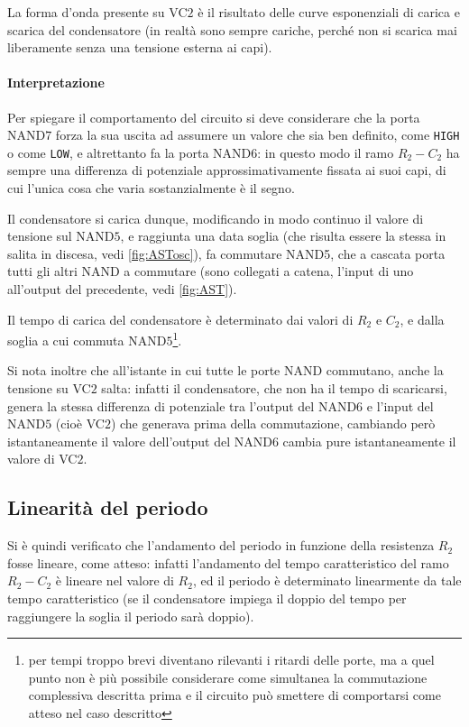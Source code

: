 \documentclass[a4paper,10pt]{article}
\def\code#1{\texttt{#1}}
\begin{document}
La forma d'onda presente su VC$2$ è il risultato delle curve esponenziali di carica e scarica del condensatore (in realtà sono sempre cariche, perché non si scarica mai liberamente senza una tensione esterna ai capi).

\paragraph{Interpretazione} Per spiegare il comportamento del circuito si deve considerare che la porta NAND$7$ forza la sua uscita ad assumere un valore che sia ben definito, come \code{HIGH} o come \code{LOW}, e altrettanto fa la porta NAND$6$: in questo modo il ramo $R_2-C_2$ ha sempre una differenza di potenziale approssimativamente fissata ai suoi capi, di cui l'unica cosa che varia sostanzialmente è il segno.

Il condensatore si carica dunque, modificando in modo continuo il valore di tensione sul NAND$5$, e raggiunta una data soglia (che risulta essere la stessa in salita in discesa, vedi \cref{fig:ASTosc}), fa commutare NAND5, che a cascata porta tutti gli altri NAND a commutare (sono collegati a catena, l'input di uno all'output del precedente, vedi \cref{fig:AST}).

Il tempo di carica del condensatore è determinato dai valori di $R_2$ e $C_2$, e dalla soglia a cui commuta NAND$5$\footnote{per tempi troppo brevi diventano rilevanti i ritardi delle porte, ma a quel punto non è più possibile considerare come simultanea la commutazione complessiva descritta prima e il circuito può smettere di comportarsi come atteso nel caso descritto}.

Si nota inoltre che all'istante in cui tutte le porte NAND commutano, anche la tensione su VC$2$ salta: infatti il condensatore, che non ha il tempo di scaricarsi, genera la stessa differenza di potenziale tra l'output del NAND$6$ e l'input del NAND$5$ (cioè VC$2$) che generava prima della commutazione, cambiando però istantaneamente il valore dell'output del NAND$6$ cambia pure istantaneamente il valore di VC$2$.

\subsection{Linearità del periodo}
Si è quindi verificato che l'andamento del periodo in funzione della resistenza $R_2$ fosse lineare, come atteso: infatti l'andamento del tempo caratteristico del ramo $R_2-C_2$ è lineare nel valore di $R_2$, ed il periodo è determinato linearmente da tale tempo caratteristico (se il condensatore impiega il doppio del tempo per raggiungere la soglia il periodo sarà doppio).
\end{document}
